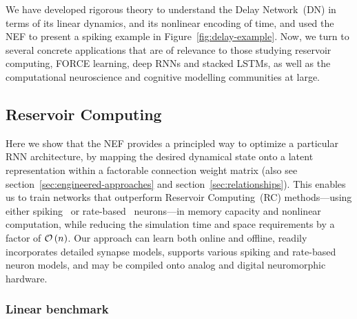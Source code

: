 We have developed rigorous theory to understand the Delay Network~(DN) in terms of its linear dynamics, and its nonlinear encoding of time, and used the NEF to present a spiking example in Figure~\ref{fig:delay-example}.
Now, we turn to several concrete applications that are of relevance to those studying reservoir computing, FORCE learning, deep RNNs and stacked LSTMs, as well as the computational neuroscience and cognitive modelling communities at large.

\subsection{Reservoir Computing}
\label{sec:delay-rc}

Here we show that the NEF provides a principled way to optimize a particular RNN architecture, by mapping the desired dynamical state onto a latent representation within a factorable connection weight matrix (also see section~\ref{sec:engineered-approaches} and section~\ref{sec:relationships}).
This enables us to train networks that outperform Reservoir Computing~(RC) methods---using either spiking~\citep[LSM;][]{maass2002real} or rate-based~\citep[ESN;][]{jaeger2001echo} neurons---in memory capacity and nonlinear computation, while reducing the simulation time and space requirements by a factor of $\mathcal{O}\left({n}\right)$.
Our approach can learn both online and offline, readily incorporates detailed synapse models, supports various spiking and rate-based neuron models, and may be compiled onto analog and digital neuromorphic hardware.

\subsubsection{Linear benchmark}

